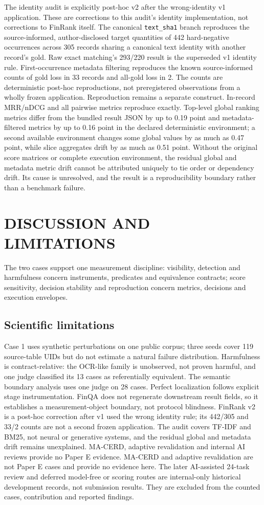 \documentclass[a4paper,twoside]{article}
\begin{document}
The identity audit is explicitly post-hoc v2 after the wrong-identity v1 application. These are corrections to this audit's identity implementation, not corrections to FinRank itself. The canonical \texttt{text\_sha1} branch reproduces the source-informed, author-disclosed target quantities of 442 hard-negative occurrences across 305 records sharing a canonical text identity with another record's gold. Raw exact matching's 293/220 result is the superseded v1 identity rule. First-occurrence metadata filtering reproduces the known source-informed counts of gold loss in 33 records and all-gold loss in 2. The counts are deterministic post-hoc reproductions, not preregistered observations from a wholly frozen application.
Reproduction remains a separate construct. In-record MRR/nDCG and all pairwise metrics reproduce exactly. Top-level global ranking metrics differ from the bundled result JSON by up to 0.19 point and metadata-filtered metrics by up to 0.16 point in the declared deterministic environment; a second available environment changes some global values by as much as 0.47 point, while slice aggregates drift by as much as 0.51 point. Without the original score matrices or complete execution environment, the residual global and metadata metric drift cannot be attributed uniquely to tie order or dependency drift. Its cause is unresolved, and the result is a reproducibility boundary rather than a benchmark failure.
\section{\uppercase{Discussion and Limitations}}
The two cases support one measurement discipline: visibility, detection and harmfulness concern instruments, predicates and equivalence contracts; score sensitivity, decision stability and reproduction concern metrics, decisions and execution envelopes.
\subsection{Scientific limitations}
Case 1 uses synthetic perturbations on one public corpus; three seeds cover 119 source-table UIDs but do not estimate a natural failure distribution. Harmfulness is contract-relative: the OCR-like family is unobserved, not proven harmful, and one judge classified its 13 cases as referentially equivalent. The semantic boundary analysis uses one judge on 28 cases. Perfect localization follows explicit stage instrumentation. FinQA does not regenerate downstream result fields, so it establishes a measurement-object boundary, not protocol blindness.
FinRank v2 is a post-hoc correction after v1 used the wrong identity rule; its 442/305 and 33/2 counts are not a second frozen application. The audit covers TF-IDF and BM25, not neural or generative systems, and the residual global and metadata drift remains unexplained. MA-CERD, adaptive revalidation and internal AI reviews provide no Paper E evidence.
MA-CERD and adaptive revalidation are not Paper E cases and provide no evidence here. The later AI-assisted 24-task review and deferred model-free or scoring routes are internal-only historical development records, not submission results. They are excluded from the counted cases, contribution and reported findings.
\end{document}

